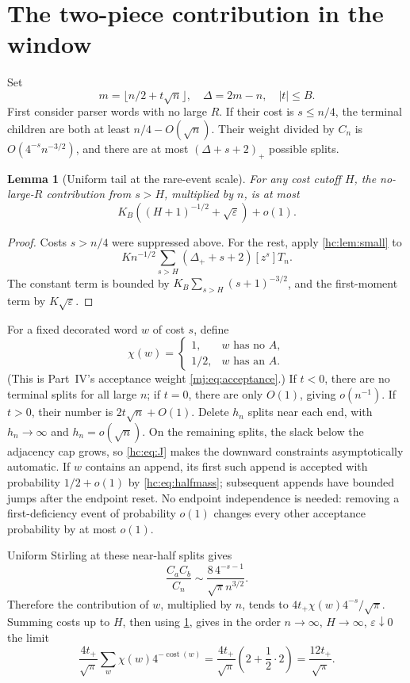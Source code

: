 \documentclass[11pt,a4paper]{article}
\newtheorem{lemma}[lemma]{Lemma}
\theoremstyle{definition}\newaliascnt{definition}{theorem}
\theoremstyle{remark}\newaliascnt{remark}{theorem}
\newcommand{\ljcost}{\operatorname{cost}}
\begin{document}
\section{The two-piece contribution in the window}
\label{hc:sec:twopiece}
Set
\[
 m=\lfloor n/2+t\sqrt n\rfloor,\quad
 \Delta=2m-n,\quad |t|\le B.
\]
First consider parser words with no large $R$. If their cost is $s\le n/4$,
the terminal children are both at least $n/4-O(\sqrt n)$. Their weight
divided by $C_n$ is $O(4^{-s}n^{-3/2})$, and there are at most
$(\Delta+s+2)_+$ possible splits.

\begin{lemma}[Uniform tail at the rare-event scale]\label{hc:lem:pairtail}
For any cost cutoff $H$, the no-large-$R$ contribution from $s>H$, multiplied
by $n$, is at most
\begin{equation}\label{hc:eq:pairtail}
 K_B\left((H+1)^{-1/2}+\sqrt\varepsilon\right)+o(1).
\end{equation}
\end{lemma}
\begin{proof}
Costs $s>n/4$ were suppressed above. For the rest, apply
\cref{hc:lem:small} to
\[
 K n^{-1/2}\sum_{s>H}(\Delta_++s+2)[z^s]T_n.
\]
The constant term is bounded by $K_B\sum_{s>H}(s+1)^{-3/2}$, and the
first-moment term by $K\sqrt\varepsilon$.
\end{proof}

For a fixed decorated word $w$ of cost $s$, define
\[
 \chi(w)=\begin{cases}1,&w\text{ has no }A,\\1/2,&w\text{ has an }A.\end{cases}
\]
(This is Part~IV's acceptance weight \eqref{mj:eq:acceptance}.) If $t<0$,
there are no terminal splits for all large $n$; if $t=0$, there are only
$O(1)$, giving $o(n^{-1})$. If $t>0$, their number is $2t\sqrt n+O(1)$.
Delete $h_n$ splits near each end, with $h_n\to\infty$ and
$h_n=o(\sqrt n)$. On the remaining splits, the slack below the adjacency cap
grows, so \eqref{hc:eq:J} makes the downward constraints asymptotically
automatic. If $w$ contains an append, its first such append is accepted with
probability $1/2+o(1)$ by \eqref{hc:eq:halfmass}; subsequent appends have
bounded jumps after the endpoint reset. No endpoint independence is needed:
removing a first-deficiency event of probability $o(1)$ changes every other
acceptance probability by at most $o(1)$.

Uniform Stirling at these near-half splits gives
\[
 \frac{C_aC_b}{C_n}
 \sim\frac{8\,4^{-s-1}}{\sqrt\pi n^{3/2}}.
\]
Therefore the contribution of $w$, multiplied by $n$, tends to
$4t_+\chi(w)4^{-s}/\sqrt\pi$. Summing costs up to $H$, then using
\cref{hc:lem:pairtail}, gives in the order $n\to\infty$, $H\to\infty$,
$\varepsilon\downarrow0$ the limit
\begin{equation}\label{hc:eq:ramp}
 \frac{4t_+}{\sqrt\pi}\sum_w\chi(w)4^{-\ljcost(w)}
 =\frac{4t_+}{\sqrt\pi}\left(2+\frac12\cdot2\right)
 =\frac{12t_+}{\sqrt\pi}.
\end{equation}
\end{document}
